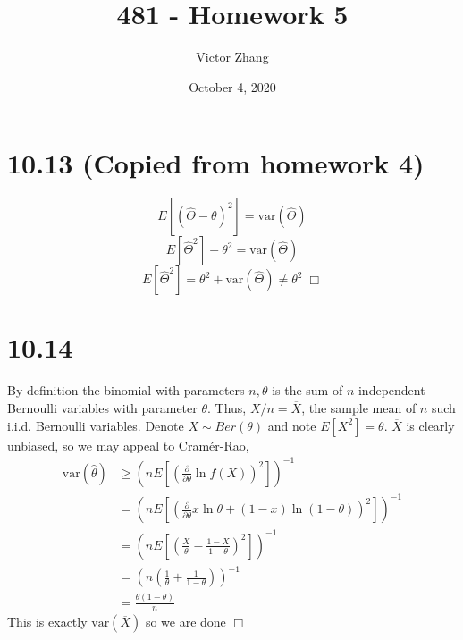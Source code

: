 \documentclass{article}
\title{481 - Homework 5}
\author{Victor Zhang}
\date{October 4, 2020}
\newcommand{\var}[1]{\mathrm{var}(#1)}
\newcommand{\inv}[1]{\left( #1 \right)^{-1}}
\begin{document}
\maketitle

\section*{10.13 (Copied from homework 4)}
$$E[(\hat{\Theta}-\theta)^2] = \mathrm{var}(\hat{\Theta})$$
$$E[\hat{\Theta}^2] - \theta^2 = \mathrm{var}(\hat{\Theta})$$
$$E[\hat{\Theta}^2] = \theta^2 + \mathrm{var}(\hat{\Theta}) \neq \theta^2 \; \Box$$

\section*{10.14}
By definition the binomial with parameters $n,\theta$ is the sum of $n$ independent Bernoulli variables with parameter $\theta$. Thus, $X/n = \overline{X}$, the sample mean of $n$ such i.i.d. Bernoulli variables. Denote $X \sim Ber(\theta)$ and note $E[X^2] = \theta$. $\overline{X}$ is clearly unbiased, so we may appeal to Cram\'er-Rao,
\begin{equation*}
\begin{split}
  \var{\hat{\theta}} &\geq \inv{n E\left[\left(\frac{\partial}{\partial\theta} \ln f(X)\right)^2 \right]}\\
  &= \inv{nE\left[\left(\frac{\partial}{\partial\theta} x\ln\theta + (1-x)\ln(1-\theta)\right)^2 \right]}\\
  &= \inv{nE\left[\left(\frac{X}{\theta} - \frac{1-X}{1-\theta} \right)^2 \right]}\\
  &= \inv{n\left( \frac{1}{\theta} + \frac{1}{1-\theta} \right)}\\
  &= \frac{\theta(1-\theta)}{n}
\end{split}
\end{equation*}
This is exactly $\var{\overline{X}}$ so we are done $\Box$
\end{document}
